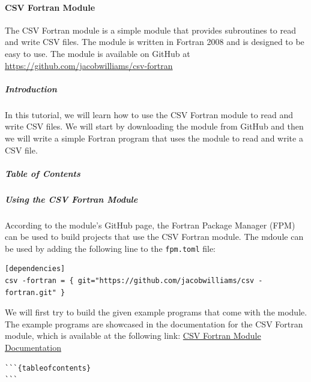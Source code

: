 \paragraph{CSV Fortran Module}

The CSV Fortran module is a simple module that provides subroutines to read and write CSV files. The module is written in Fortran 2008 and is designed to be easy to use. The module is available on GitHub at \href{https://github.com/jacobwilliams/csv-fortran}{https://github.com/jacobwilliams/csv-fortran}

\subparagraph{Introduction}

In this tutorial, we will learn how to use the CSV Fortran module to read and write CSV files. We will start by downloading the module from GitHub and then we will write a simple Fortran program that uses the module to read and write a CSV file.

\subparagraph{Table of Contents}

\tableofcontents

\subparagraph{Using the CSV Fortran Module}

According to the module's GitHub page, the Fortran Package Manager (FPM) can be used to build projects that use the CSV Fortran module. The mdoule can be used by adding the following line to the \texttt{fpm.toml} file:

\begin{verbatim}
[dependencies]
csv -fortran = { git="https://github.com/jacobwilliams/csv -fortran.git" }
\end{verbatim}

We will first try to build the given example programs that come with the module. The example programs are showcased in the documentation for the CSV Fortran module, which is available at the following link: \href{https://jacobwilliams.github.io/csv-fortran/}{CSV Fortran Module Documentation}

\begin{verbatim}
```{tableofcontents}
```
\end{verbatim}